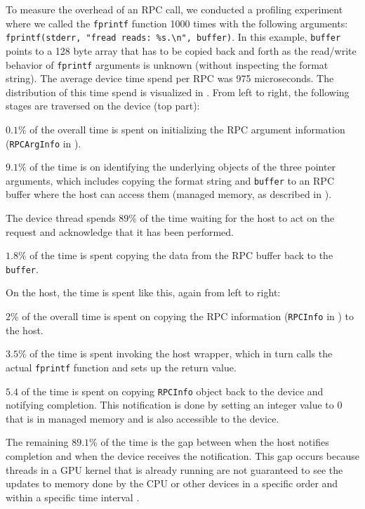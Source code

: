 To measure the overhead of an RPC call, we conducted a profiling experiment where we called the \lstinline{fprintf} function 1000 times with the following arguments: \lstinline{fprintf(stderr, "fread reads: %s.\n", buffer)}. 
In this example, \lstinline|buffer| points to a 128 byte array that has to be copied back and forth as the read/write behavior of \lstinline|fprintf| arguments is unknown (without inspecting the format string).
The average device time spend per RPC was 975 microseconds.
The distribution of this time spend is visualized in .
From left to right, the following stages are traversed on the device (top part):
\begin{inparaenum}[1)]
\item $0.1$\% of the overall time is spent on initializing the RPC argument information (\lstinline{RPCArgInfo} in ).
\item $9.1\%$ of the time is on identifying the underlying objects of the three pointer arguments, which includes copying the format string and \lstinline{buffer} to an RPC buffer where the host can access them (managed memory, as described in ). 
\item The device thread spends $89$\% of the time waiting for the host to act on the request and acknowledge that it has been performed.
\item $1.8\%$ of the time is spent copying the data from the RPC buffer back to the \lstinline{buffer}.
\end{inparaenum}
On the host, the time is spent like this, again from left to right:
\begin{inparaenum}[1)]
\item $2$\% of the overall time is spent on copying the RPC information (\lstinline{RPCInfo} in ) to the host.
\item $3.5$\% of the time is spent invoking the host wrapper, which in turn calls the actual \lstinline{fprintf} function and sets up the return value.
\item $5.4$ of the time is spent on copying \lstinline{RPCInfo} object back to the device and notifying completion.
This notification is done by setting an integer value to 0 that is in managed memory and is also accessible to the device.
\item The remaining $89.1$\% of the time is the gap between when the host notifies completion and when the device receives the notification.
This gap occurs because threads in a GPU kernel that is already running are not guaranteed to see the updates to memory done by the CPU or other devices in a specific order and within a specific time interval \cite{DBLP:conf/hipc/PotluriGRNVI17,DBLP:conf/hpdc/DaoudWS16}.
\end{inparaenum}


